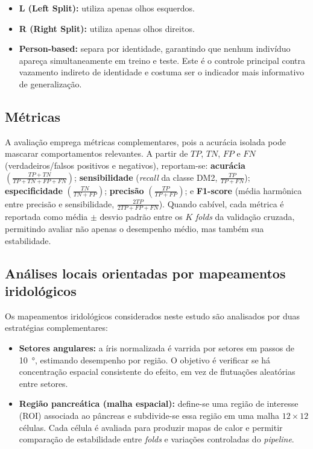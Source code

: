 \documentclass[11pt,a4paper]{article}
\begin{document}
\begin{itemize}
    \item \textbf{L (Left Split):} utiliza apenas olhos esquerdos.
    \item \textbf{R (Right Split):} utiliza apenas olhos direitos.
    \item \textbf{Person-based:} separa por identidade, garantindo que nenhum indivíduo apareça simultaneamente em treino e teste. Este é o controle principal contra vazamento indireto de identidade e costuma ser o indicador mais informativo de generalização.
\end{itemize}

\subsection{Métricas}
A avaliação emprega métricas complementares, pois a acurácia isolada pode mascarar comportamentos relevantes. A partir de \(TP\), \(TN\), \(FP\) e \(FN\) (verdadeiros/falsos positivos e negativos), reportam-se: \textbf{acurácia} \(\left(\tfrac{TP+TN}{TP+TN+FP+FN}\right)\); \textbf{sensibilidade} (\textit{recall} da classe DM2, \(\tfrac{TP}{TP+FN}\)); \textbf{especificidade} \(\left(\tfrac{TN}{TN+FP}\right)\); \textbf{precisão} \(\left(\tfrac{TP}{TP+FP}\right)\); e \textbf{F1-score} (média harmônica entre precisão e sensibilidade, \(\tfrac{2TP}{2TP+FP+FN}\)). Quando cabível, cada métrica é reportada como média \(\pm\) desvio padrão entre os \(K\) \textit{folds} da validação cruzada, permitindo avaliar não apenas o desempenho médio, mas também sua estabilidade.
\subsection{Análises locais orientadas por mapeamentos iridológicos}
\label{sec:locais}
Os mapeamentos iridológicos considerados neste estudo são analisados por duas estratégias complementares:

\begin{itemize}
    \item \textbf{Setores angulares:} a íris normalizada é varrida por setores em passos de \SI{10}{\degree}, estimando desempenho por região. O objetivo é verificar se há concentração espacial consistente do efeito, em vez de flutuações aleatórias entre setores.

    \item \textbf{Região pancreática (malha espacial):} define-se uma região de interesse (ROI) associada ao pâncreas e subdivide-se essa região em uma malha \(\num{12}\times\num{12}\) células. Cada célula é avaliada para produzir mapas de calor e permitir comparação de estabilidade entre \textit{folds} e variações controladas do \textit{pipeline}.
\end{itemize}
\end{document}
